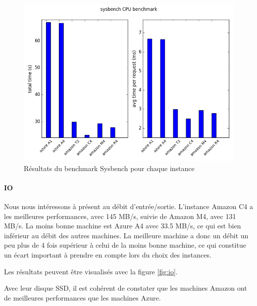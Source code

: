 \begin{figure}[h]
  \begin{center}
    \includegraphics[width=\textwidth]{plot_CPU.png}
    \caption{Résultats du benchmark Sysbench pour chaque instance}
    \label{fig:cpu}
  \end{center}
\end{figure}

\paragraph{IO}

Nous nous intéressons à présent au débit d'entrée/sortie. L'instance Amazon C4 a les meilleures performances, avec 145 MB/s, suivie de Amazon M4, avec 131 MB/s. La moins bonne machine est Azure A4 avec 33.5 MB/s, ce qui est bien inférieur au débit des autres machines. La meilleure machine a donc un débit un peu plus de 4 fois supérieur à celui de la moins bonne machine, ce qui constitue un écart important à prendre en compte lors du choix des instances.

Les résultats peuvent être visualisés avec la figure \ref{fig:io}.

Avec leur disque SSD, il est cohérent de constater que les machines Amazon ont de meilleures performances que les machines Azure.

